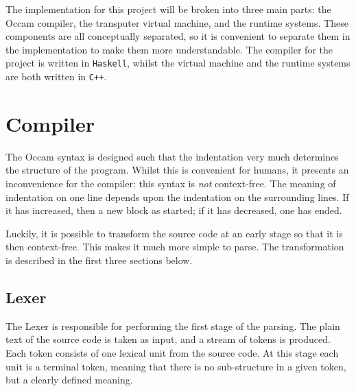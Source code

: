 The implementation for this project will be broken into three main parts: the
Occam compiler, the \gls{transputer} virtual machine, and the runtime systems.
These components are all conceptually separated, so it is convenient to separate
them in the implementation to make them more understandable. The compiler for
the project is written in \texttt{Haskell}, whilst the virtual machine and the
runtime systems are both written in \texttt{C++}.

\section{Compiler}

The Occam syntax is designed such that the indentation very much determines the
structure of the program. Whilst this is convenient for humans, it presents an
inconvenience for the compiler: this syntax is \textit{not} context-free. The
meaning of indentation on one line depends upon the indentation on the
surrounding lines. If it has increased, then a new block as started; if it has
decreased, one has ended.

Luckily, it is possible to transform the source code at an early stage so that
it is then context-free. This makes it much more simple to parse. The
transformation is described in the first three sections below.

\subsection{Lexer} \label{design-lexer}

The Lexer is responsible for performing the first stage of the parsing. The
plain text of the source code is taken as input, and a stream of tokens is
produced. Each token consists of one lexical unit from the source code. At this
stage each unit is a terminal token, meaning that there is no sub-structure in
a given token, but a clearly defined meaning.


